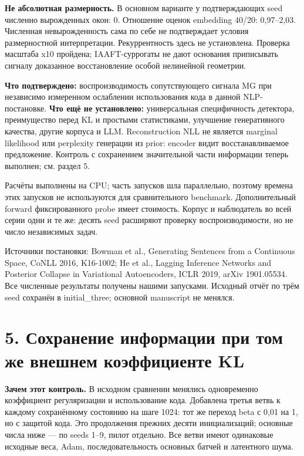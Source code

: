 \documentclass[10pt,a4paper]{article}
\begin{document}
\textbf{Не абсолютная размерность.} В основном варианте у подтверждающих seed численно вырожденных окон: 0. Отношение оценок embedding 40/20: 0,97--2,03. Численная невырожденность сама по себе не подтверждает условия размерностной интерпретации. Рекуррентность здесь не установлена. Проверка масштаба x10 пройдена; IAAFT-суррогаты не дают основания приписывать сигналу доказанное восстановление особой нелинейной геометрии.

\textbf{Что подтверждено:} воспроизводимость сопутствующего сигнала MG при независимо измеренном ослаблении использования кода в данной NLP-постановке. \textbf{Что ещё не установлено:} универсальная специфичность детектора, преимущество перед KL и простыми статистиками, улучшение генеративного качества, другие корпуса и LLM. Reconstruction NLL не является marginal likelihood или perplexity генерации из prior: encoder видит восстанавливаемое предложение. Контроль с сохранением значительной части информации теперь выполнен; см. раздел 5.

Расчёты выполнены на CPU; часть запусков шла параллельно, поэтому времена этих запусков не используются для сравнительного benchmark. Дополнительный forward фиксированного probe имеет стоимость. Корпус и наблюдатель во всей серии одни и те же: десять seed расширяют проверку воспроизводимости, но не число независимых задач.

Источники постановки: Bowman et al., Generating Sentences from a Continuous Space, CoNLL 2016, K16-1002; He et al., Lagging Inference Networks and Posterior Collapse in Variational Autoencoders, ICLR 2019, arXiv 1901.05534. Все численные результаты получены нашими запусками. Исходный отчёт по трём seed сохранён в initial\_three; основной manuscript не менялся.


\newpage

\section*{5. Сохранение информации при том же внешнем коэффициенте KL}

\textbf{Зачем этот контроль.} В исходном сравнении менялись одновременно коэффициент регуляризации и использование кода. Добавлена третья ветвь к каждому сохранённому состоянию на шаге 1024: тот же переход beta с 0,01 на 1, но с защитой кода. Это продолжения прежних десяти инициализаций; основные числа ниже --- по seeds 1--9, пилот отдельно. Все ветви имеют одинаковые исходные веса, Adam, последовательность основных батчей и латентного шума.
\end{document}
